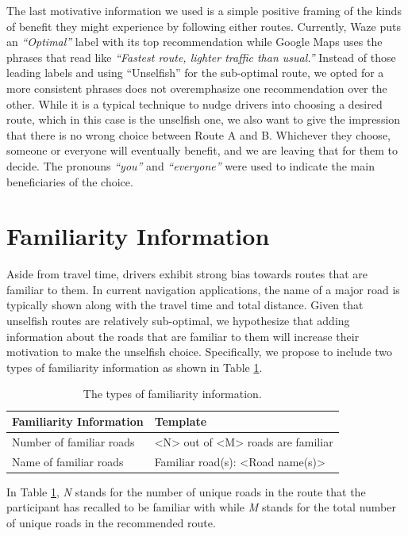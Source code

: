 The last motivative information we used is a simple positive framing of the kinds of benefit they might experience by following either routes. Currently, Waze puts an \textit{``Optimal''} label with its top recommendation while Google Maps uses the phrases that read like \textit{``Fastest route, lighter traffic than usual.''} Instead of those leading labels and using ``Unselfish'' for the sub-optimal route, we opted for a more consistent phrases does not overemphasize one recommendation over the other. While it is a typical technique to nudge drivers into choosing a desired route, which in this case is the unselfish one, we also want to give the impression that there is no wrong choice between Route A and B. Whichever they choose, someone or everyone will eventually benefit, and we are leaving that for them to decide. The pronouns \textit{``you''} and \textit{``everyone''} were used to indicate the main beneficiaries of the choice. 

\section{Familiarity Information}
Aside from travel time, drivers exhibit strong bias towards routes that are familiar to them\cite{Samson:2019:EFI:3290605.3300601,Patel2006PersonalizingRoutes}. In current navigation applications, the name of a major road is typically shown along with the travel time and total distance. Given that unselfish routes are relatively sub-optimal, we hypothesize that adding information about the roads that are familiar to them will increase their motivation to make the unselfish choice. Specifically, we propose to include two types of familiarity information as shown in Table \ref{tab:fam-info}. 

\begin{table}[h]
    \caption{The types of familiarity information.}
	\label{tab:fam-info}
	\centering
	\begin{tabular}{l l}
	    \hline\hline
		\textbf{Familiarity Information} & \textbf{Template} \\
		\hline
		Number of familiar roads & <N> out of <M> roads are familiar \\
        Name of familiar roads & Familiar road(s): <Road name(s)> \\
		\hline
	\end{tabular}
\end{table}

In Table \ref{tab:fam-info}, \textit{N} stands for the number of unique roads in the route that the participant has recalled to be familiar with while \textit{M} stands for the total number of unique roads in the recommended route.

